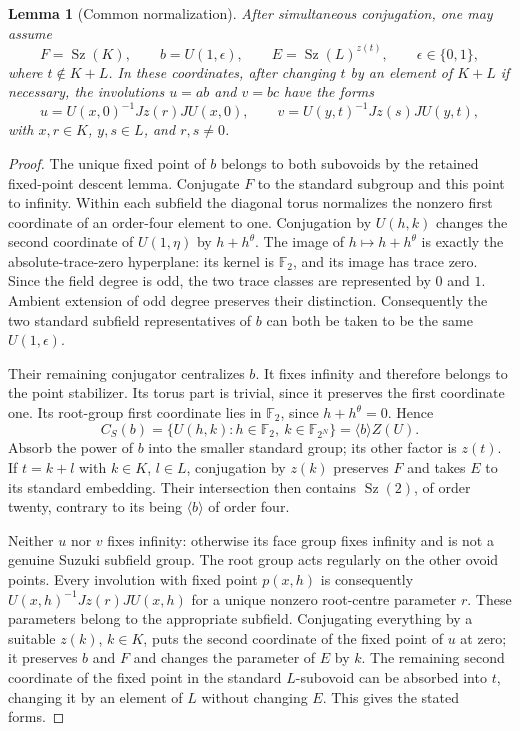 \documentclass[11pt,a4paper]{article}
\newtheorem{lemma}{Lemma}\newtheorem{proposition}[lemma]{Proposition}
\newcommand{\Sz}{\operatorname{Sz}}
\begin{document}
\begin{lemma}[Common normalization]\label{normal}
After simultaneous conjugation, one may assume
\[
 F=\Sz(K),\qquad b=U(1,\epsilon),\qquad
 E=\Sz(L)^{z(t)},\qquad \epsilon\in\{0,1\},
\]
where $t\notin K+L$. In these coordinates, after changing $t$ by
an element of $K+L$ if necessary, the involutions $u=ab$ and $v=bc$
have the forms
\[
 u=U(x,0)^{-1}Jz(r)JU(x,0),\qquad
 v=U(y,t)^{-1}Jz(s)JU(y,t),
\]
with $x,r\in K$, $y,s\in L$, and $r,s\ne0$.
\end{lemma}
\begin{proof}
The unique fixed point of $b$ belongs to both subovoids by the retained
fixed-point descent lemma. Conjugate $F$ to the standard subgroup and
this point to infinity. Within each subfield the diagonal torus
normalizes the nonzero first coordinate of an order-four element to
one. Conjugation by $U(h,k)$ changes the second coordinate of
$U(1,\eta)$ by $h+h^\theta$. The image of $h\mapsto h+h^\theta$
is exactly the absolute-trace-zero hyperplane: its kernel is
$\mathbb F_2$, and its image has trace zero. Since the field degree
is odd, the two trace classes are represented by $0$ and $1$.
Ambient extension of odd degree preserves their distinction.
Consequently the two standard subfield representatives of $b$ can
both be taken to be the same $U(1,\epsilon)$.

Their remaining conjugator centralizes $b$. It fixes infinity and
therefore belongs to the point stabilizer. Its torus part is trivial,
since it preserves the first coordinate one. Its root-group first
coordinate lies in $\mathbb F_2$, since $h+h^\theta=0$. Hence
\[
 C_S(b)=\{U(h,k):h\in\mathbb F_2,\ k\in\mathbb F_{2^N}\}
       =\langle b\rangle Z(U).
\]
Absorb the power of $b$ into the smaller standard group; its other
factor is $z(t)$. If $t=k+l$ with $k\in K$, $l\in L$, conjugation
by $z(k)$ preserves $F$ and takes $E$ to its standard embedding.
Their intersection then contains $\Sz(2)$, of order twenty,
contrary to its being $\langle b\rangle$ of order four.

Neither $u$ nor $v$ fixes infinity: otherwise its face group fixes
infinity and is not a genuine Suzuki subfield group. The root group
acts regularly on the other ovoid points. Every involution with fixed
point $p(x,h)$ is consequently
$U(x,h)^{-1}Jz(r)JU(x,h)$ for a unique nonzero root-centre parameter
$r$. These parameters belong to the appropriate subfield. Conjugating
everything by a suitable $z(k)$, $k\in K$, puts the second coordinate
of the fixed point of $u$ at zero; it preserves $b$ and $F$ and changes
the parameter of $E$ by $k$. The remaining second coordinate of the
fixed point in the standard $L$-subovoid can be absorbed into $t$,
changing it by an element of $L$ without changing $E$. This gives the
stated forms.
\end{proof}
\end{document}
